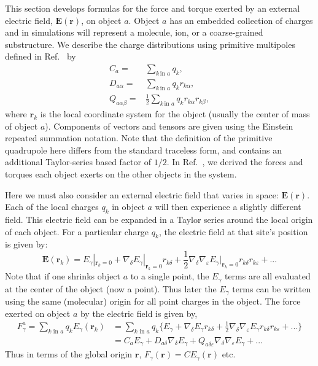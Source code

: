 This section develops formulas for the force and torque exerted by an
external electric field, $\mathbf{E}(\mathbf{r})$, on object
$a$.\cite{Raab:2004ve} Object $a$ has an embedded collection of
charges and in simulations will represent a molecule, ion, or a
coarse-grained substructure. We describe the charge distributions
using primitive multipoles defined in Ref.~\cite{PaperI} by
\begin{align}
C_a =&\sum_{k \, \text{in }a} q_k , \label{eq:charge} \\
D_{a\alpha} =&\sum_{k \, \text{in }a} q_k r_{k\alpha}, \label{eq:dipole}\\
Q_{a\alpha\beta} =& \frac{1}{2} \sum_{k \, \text{in }  a} q_k
r_{k\alpha}  r_{k\beta},
\label{eq:quadrupole}
\end{align}
where $\mathbf{r}_k$ is the local coordinate system for the object
(usually the center of mass of object $a$).  Components of vectors and
tensors are given using the Einstein repeated summation notation. Note
that the definition of the primitive quadrupole here differs from the
standard traceless form, and contains an additional Taylor-series
based factor of $1/2$. In Ref.~\cite{PaperI}, we derived the
forces and torques each object exerts on the other objects in the
system.

Here we must also consider an external electric field that varies in
space: $\mathbf E(\mathbf r)$.  Each of the local charges $q_k$ in
object $a$ will then experience a slightly different field.  This
electric field can be expanded in a Taylor series around the local
origin of each object. For a particular charge $q_k$, the electric
field at that site's position is given by:
\begin{equation}
\mathbf{E}(\mathbf{r}_k) = E_\gamma|_{\mathbf{r}_k = 0} + \nabla_\delta E_\gamma |_{\mathbf{r}_k = 0}  r_{k \delta} 
+ \frac {1}{2} \nabla_\delta \nabla_\varepsilon E_\gamma|_{\mathbf{r}_k = 0}  r_{k \delta}
r_{k \varepsilon} + ... 
\end{equation}
Note that if one shrinks object $a$ to a single point, the
${E}_\gamma$ terms are all evaluated at the center of the object (now
a point). Thus later the ${E}_\gamma$ terms can be written using the
same (molecular) origin for all point charges in the object. The force
exerted on object $a$ by the electric field is given by,
\begin{align}
F^a_\gamma = \sum_{k \textrm{~in~} a} q_k E_\gamma(\mathbf{r}_k) &=  \sum_{k \textrm{~in~} a} q_k \lbrace E_\gamma + \nabla_\delta E_\gamma r_{k \delta} 
+ \frac {1}{2} \nabla_\delta \nabla_\varepsilon E_\gamma r_{k \delta}
r_{k \varepsilon} + ...  \rbrace  \\
 &= C_a E_\gamma + D_{a  \delta} \nabla_\delta E_\gamma 
+ Q_{a \delta \varepsilon} \nabla_\delta \nabla_\varepsilon E_\gamma +
... 
\end{align}
Thus in terms of the global origin $\mathbf{r}$, ${F}_\gamma(\mathbf{r}) = C {E}_\gamma(\mathbf{r})$ etc. 
  

